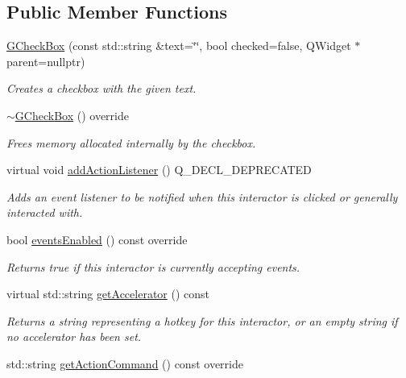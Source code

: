 \subsection*{Public Member Functions}
\begin{DoxyCompactItemize}
\item 
\mbox{\hyperlink{classGCheckBox_ab79c27853bb6f5b8ec3ea139ef556f25}{G\+Check\+Box}} (const std\+::string \&text=\char`\"{}\char`\"{}, bool checked=false, Q\+Widget $\ast$parent=nullptr)
\begin{DoxyCompactList}\small\item\em Creates a checkbox with the given text. \end{DoxyCompactList}\item 
\mbox{\hyperlink{classGCheckBox_a40853b1ff7d4f861d33054a5df7fb86d}{$\sim$\+G\+Check\+Box}} () override
\begin{DoxyCompactList}\small\item\em Frees memory allocated internally by the checkbox. \end{DoxyCompactList}\item 
virtual void \mbox{\hyperlink{classGInteractor_a02f20ea6edfa0671f31c4c648a253833}{add\+Action\+Listener}} () Q\+\_\+\+D\+E\+C\+L\+\_\+\+D\+E\+P\+R\+E\+C\+A\+T\+ED
\begin{DoxyCompactList}\small\item\em Adds an event listener to be notified when this interactor is clicked or generally interacted with. \end{DoxyCompactList}\item 
bool \mbox{\hyperlink{classGInteractor_a597a370b592e3737d38d9d2f4e2031ea}{events\+Enabled}} () const override
\begin{DoxyCompactList}\small\item\em Returns true if this interactor is currently accepting events. \end{DoxyCompactList}\item 
virtual std\+::string \mbox{\hyperlink{classGInteractor_a69f8d23ed8f207fbecad99960776e942}{get\+Accelerator}} () const
\begin{DoxyCompactList}\small\item\em Returns a string representing a hotkey for this interactor, or an empty string if no accelerator has been set. \end{DoxyCompactList}\item 
std\+::string \mbox{\hyperlink{classGCheckBox_a4f83505141da1f8446f0e0e0a9507930}{get\+Action\+Command}} () const override

\end{DoxyCompactItemize}
